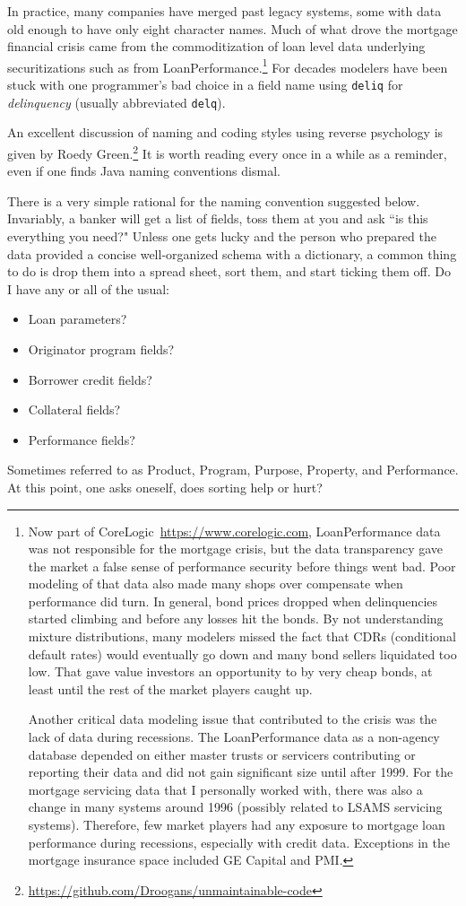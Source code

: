 \documentclass[10pt]{article}
\begin{document}
In practice, many companies have merged past legacy systems, some with data old enough to have only eight character names.
Much of what drove the mortgage financial crisis came from the commoditization of loan level data 
underlying securitizations such as from LoanPerformance.\footnote{Now part of CoreLogic~\url{https://www.corelogic.com},
LoanPerformance data was not responsible for the mortgage crisis, but the data transparency gave 
the market a false sense of
performance security before things went bad.  Poor modeling of that data also made many shops over compensate
when performance did turn.  In general, bond prices dropped when delinquencies started climbing and before
any losses hit the bonds.  By not understanding mixture distributions, many modelers missed the fact that
CDRs (conditional default rates) would eventually go down and many bond sellers liquidated too low.
That gave value investors an opportunity to by very cheap bonds, at least until the rest of the market players 
caught up. \par
Another critical data modeling issue that contributed to the crisis was the lack of data during recessions.  
The LoanPerformance data as a non-agency database 
depended on either master trusts or servicers contributing or reporting their data and did not gain significant size until after 1999.
For the mortgage servicing data that I personally worked with, there was also a change in many systems around 1996 (possibly
related to LSAMS servicing systems). Therefore, few market players had any exposure to mortgage loan performance
during recessions, especially with credit data. Exceptions in the mortgage insurance space included GE Capital and PMI.
}
For decades modelers have been stuck with one programmer's bad choice in a field name using {\tt deliq} for {\em delinquency}
(usually abbreviated {\tt delq}).

An excellent discussion of naming and coding styles using reverse psychology is given by 
Roedy Green.\footnote{\url{https://github.com/Droogans/unmaintainable-code}} It is worth reading every once in a while
as a reminder, even if one finds Java naming conventions dismal.


There is a very simple rational for the naming convention suggested below.  Invariably, a banker will get a list of
fields, toss them at you and ask ``is this everything you need?" Unless one gets lucky and the person who prepared the
data provided a concise well-organized schema with a dictionary, a common thing to do is drop them into a spread sheet, 
sort them, and start ticking them off.   Do I have any or all of the usual:
\begin{itemize}
    \item Loan parameters?
    \item Originator program fields?
    \item Borrower credit fields?
    \item Collateral fields?
    \item Performance fields?
\end{itemize}
Sometimes referred to as Product, Program, Purpose, Property, and Performance.  At this point, one asks oneself, does 
sorting help or hurt?
\end{document}
